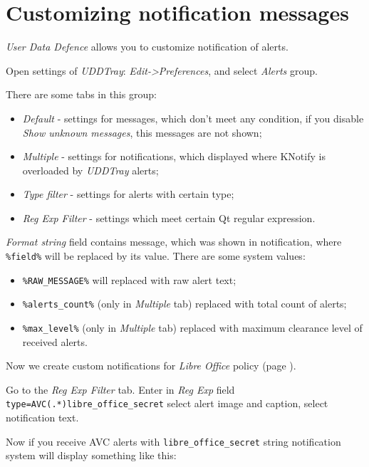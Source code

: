 \section{Customizing notification messages}

\emph{User Data Defence} allows you to customize notification of alerts.

Open settings of \emph{UDDTray}: \emph{Edit-\textgreater{}Preferences},
and select \emph{Alerts} group.



There are some tabs in this group:

\begin{itemize}
\item
  \emph{Default} - settings for messages, which don't meet any
  condition, if you disable \emph{Show unknown messages}, this messages
  are not shown;
\item
  \emph{Multiple} - settings for notifications, which displayed where
  KNotify is overloaded by \emph{UDDTray} alerts;\\
\item
  \emph{Type filter} - settings for alerts with certain type;
\item
  \emph{Reg Exp Filter} - settings which meet certain Qt regular
  expression.
\end{itemize}

\emph{Format string} field contains message, which was shown in
notification, where \texttt{\%field\%} will be replaced by its value.
There are some system values:

\begin{itemize}
\item
  \texttt{\%RAW\_MESSAGE\%} will replaced with raw alert text;
\item
  \texttt{\%alerts\_count\%} (only in \emph{Multiple} tab) replaced with
  total count of alerts;
\item
  \texttt{\%max\_level\%} (only in \emph{Multiple} tab) replaced with
  maximum clearance level of received alerts.
\end{itemize}

Now we create custom notifications for \emph{Libre Office} policy (page \pageref{creating_new_policy}).

Go to the \emph{Reg Exp Filter} tab. Enter in \emph{Reg Exp} field
\texttt{type=AVC(.*)libre\_office\_secret} select alert image and
caption, select notification text.


Now if you receive AVC alerts with \texttt{libre\_office\_secret} string
notification system will display something like this:


